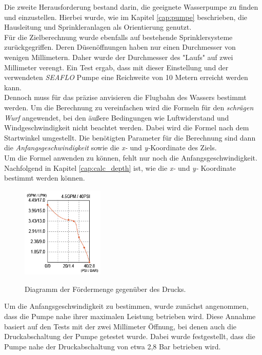 Die zweite Herausforderung bestand darin, die geeignete Wasserpumpe zu finden und einzustellen. Hierbei wurde, wie im Kapitel \ref{cap:pumpe} beschrieben, die Hausleitung und Sprinkleranlagen als Orientierung genutzt.
\\
Für die Zielberechnung wurde ebenfalls auf bestehende Sprinklersysteme zurückgegriffen. Deren Düsenöffnungen haben nur einen Durchmesser von wenigen Millimetern. Daher wurde der Durchmesser des "Laufs" auf zwei Millimeter verengt. Ein Test ergab, dass mit dieser Einstellung und der verwendeten \textit{SEAFLO} Pumpe eine Reichweite von 10 Metern erreicht werden kann.
\\
Dennoch muss für das präzise anvisieren die Flugbahn des Wassers bestimmt werden. Um die Berechnung zu vereinfachen wird die Formeln für den \textit{schrägen Wurf} angewendet, bei den äußere Bedingungen wie Luftwiderstand und Windgeschwindigkeit nicht beachtet werden. Dabei wird die Formel nach dem Startwinkel umgestellt. Die benötigten Parameter für die Berechnung sind dann die \textit{Anfangsgeschwindigkeit} sowie die \textit{x-} und \textit{y-}Koordinate des Ziels.
\\
Um die Formel anwenden zu können, fehlt nur noch die Anfangsgeschwindigkeit. Nachfolgend in Kapitel \ref{cap:calc_depth} ist, wie die \textit{x-} und \textit{y-} Koordinate bestimmt werden können.
\\
\begin{figure}
    \centering
    \includegraphics[width=0.35\textwidth]{images/seaflo_lpm_psi.png}
    \label{fig:psi_seaflo}
    \caption{Diagramm der Fördermenge gegenüber des Drucks. \cite{seaflo_pump}}
\end{figure}
Um die Anfangsgeschwindigkeit zu bestimmen, wurde zunächst angenommen, dass die Pumpe nahe ihrer maximalen Leistung betrieben wird. Diese Annahme basiert auf den Tests mit der zwei Millimeter Öffnung, bei denen auch die Druckabschaltung der Pumpe getestet wurde. Dabei wurde festgestellt, dass die Pumpe nahe der Druckabschaltung von etwa 2,8 Bar betrieben wird.
